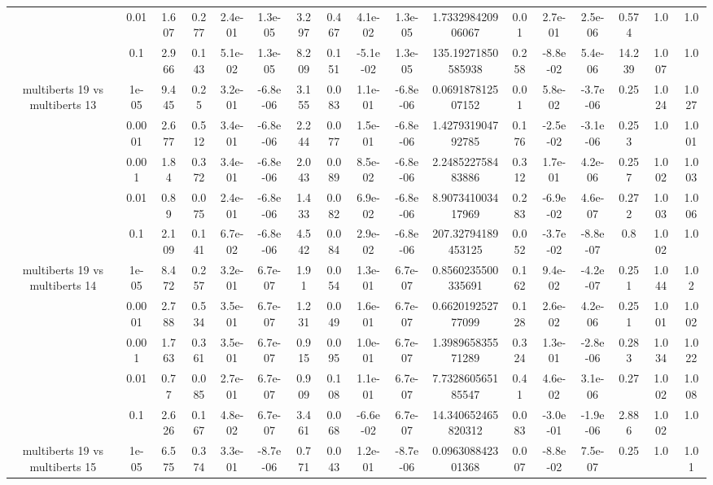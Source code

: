 \begin{tabular}{|c|c|c|c|c|c|c|c|c|c|c|c|c|c|c|c|c|}
 & 0.01 & 1.607 & 0.277 & 2.4e-01 & 1.3e-05 & 3.297 & 0.467 & 4.1e-02 & 1.3e-05 & 1.733298420906067 & 0.01 & 2.7e-01 & 2.5e-06 & 0.574 & 1.0 & 1.0 \\
 & 0.1 & 2.966 & 0.143 & 5.1e-02 & 1.3e-05 & 8.209 & 0.151 & -5.1e-02 & 1.3e-05 & 135.19271850585938 & 0.258 & -8.8e-02 & 5.4e-06 & 14.239 & 1.007 & 1.0 \\
\hline
\multirow{5}{*}{multiberts 19 vs multiberts 13} & 1e-05 & 9.445 & 0.25 & 3.2e-01 & -6.8e-06 & 3.155 & 0.083 & 1.1e-01 & -6.8e-06 & 0.069187812507152 & 0.01 & 5.8e-02 & -3.7e-06 & 0.25 & 1.024 & 1.027 \\
 & 0.0001 & 2.677 & 0.512 & 3.4e-01 & -6.8e-06 & 2.244 & 0.077 & 1.5e-01 & -6.8e-06 & 1.427931904792785 & 0.176 & -2.5e-02 & -3.1e-06 & 0.253 & 1.0 & 1.001 \\
 & 0.001 & 1.84 & 0.372 & 3.4e-01 & -6.8e-06 & 2.043 & 0.089 & 8.5e-02 & -6.8e-06 & 2.248522758483886 & 0.312 & 1.7e-01 & 4.2e-06 & 0.257 & 1.002 & 1.003 \\
 & 0.01 & 0.89 & 0.075 & 2.4e-01 & -6.8e-06 & 1.433 & 0.082 & 6.9e-02 & -6.8e-06 & 8.907341003417969 & 0.283 & -6.9e-02 & 4.6e-07 & 0.272 & 1.003 & 1.006 \\
 & 0.1 & 2.109 & 0.141 & 6.7e-02 & -6.8e-06 & 4.542 & 0.084 & 2.9e-02 & -6.8e-06 & 207.32794189453125 & 0.052 & -3.7e-02 & -8.8e-07 & 0.8 & 1.002 & 1.0 \\
\hline
\multirow{5}{*}{multiberts 19 vs multiberts 14} & 1e-05 & 8.472 & 0.257 & 3.2e-01 & 6.7e-07 & 1.91 & 0.054 & 1.3e-01 & 6.7e-07 & 0.8560235500335691 & 0.162 & 9.4e-02 & -4.2e-07 & 0.251 & 1.044 & 1.02 \\
 & 0.0001 & 2.788 & 0.534 & 3.5e-01 & 6.7e-07 & 1.231 & 0.049 & 1.6e-01 & 6.7e-07 & 0.662019252777099 & 0.128 & 2.6e-02 & 4.2e-06 & 0.251 & 1.001 & 1.002 \\
 & 0.001 & 1.763 & 0.361 & 3.5e-01 & 6.7e-07 & 0.915 & 0.095 & 1.0e-01 & 6.7e-07 & 1.398965835571289 & 0.324 & 1.3e-01 & -2.8e-06 & 0.283 & 1.034 & 1.022 \\
 & 0.01 & 0.77 & 0.085 & 2.7e-01 & 6.7e-07 & 0.909 & 0.108 & 1.1e-01 & 6.7e-07 & 7.732860565185547 & 0.41 & 4.6e-02 & 3.1e-06 & 0.27 & 1.002 & 1.008 \\
 & 0.1 & 2.626 & 0.167 & 4.8e-02 & 6.7e-07 & 3.461 & 0.068 & -6.6e-02 & 6.7e-07 & 14.340652465820312 & 0.083 & -3.0e-01 & -1.9e-06 & 2.886 & 1.002 & 1.0 \\
\hline
\multirow{5}{*}{multiberts 19 vs multiberts 15} & 1e-05 & 6.575 & 0.374 & 3.3e-01 & -8.7e-06 & 0.771 & 0.043 & 1.2e-01 & -8.7e-06 & 0.096308842301368 & 0.007 & -8.8e-02 & 7.5e-07 & 0.25 & 1.0 & 1.01 \\

\end{tabular}
